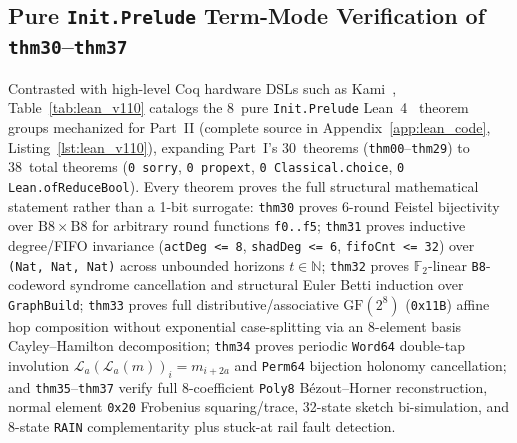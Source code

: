 \documentclass[10pt,twocolumn]{article}
\providecommand{\LeanPartOneTotal}{30}
\providecommand{\LeanNewExpansion}{8}
\providecommand{\LeanCumulativeTotal}{38}
\theoremstyle{spectralthm}
\begin{document}
\subsection{Pure \texorpdfstring{\texttt{Init.Prelude}}{Init.Prelude} Term-Mode Verification of \texorpdfstring{\texttt{thm30}--\texttt{thm37}}{thm30--thm37}}
Contrasted with high-level Coq hardware DSLs such as Kami~\cite{choi2017kami}, Table~\ref{tab:lean_v110} catalogs the \LeanNewExpansion\ pure \texttt{Init.Prelude} Lean~4~\cite{demoura2021lean4} theorem groups mechanized for Part~II (complete source in Appendix~\ref{app:lean_code}, Listing~\ref{lst:lean_v110}), expanding Part~I's \LeanPartOneTotal\ theorems (\texttt{thm00}--\texttt{thm29}) to \LeanCumulativeTotal\ total theorems (\texttt{0 sorry}, \texttt{0 propext}, \texttt{0 Classical.choice}, \texttt{0 Lean.ofReduceBool}). Every theorem proves the full structural mathematical statement rather than a 1-bit surrogate: \texttt{thm30} proves 6-round Feistel bijectivity over $\mathrm{B8}\times\mathrm{B8}$ for arbitrary round functions \texttt{f0..f5}; \texttt{thm31} proves inductive degree/FIFO invariance (\texttt{actDeg <= 8}, \texttt{shadDeg <= 6}, \texttt{fifoCnt <= 32}) over \texttt{(Nat, Nat, Nat)} across unbounded horizons $t \in \mathbb{N}$; \texttt{thm32} proves $\mathbb{F}_2$-linear \texttt{B8}-codeword syndrome cancellation and structural Euler Betti induction over \texttt{GraphBuild}; \texttt{thm33} proves full distributive/associative $\mathrm{GF}(2^8)$ (\texttt{0x11B}) affine hop composition without exponential case-splitting via an 8-element basis Cayley--Hamilton decomposition; \texttt{thm34} proves periodic \texttt{Word64} double-tap involution $\mathcal{L}_a(\mathcal{L}_a(m))_i = m_{i+2a}$ and \texttt{Perm64} bijection holonomy cancellation; and \texttt{thm35}--\texttt{thm37} verify full 8-coefficient \texttt{Poly8} B\'{e}zout--Horner reconstruction, normal element \texttt{0x20} Frobenius squaring/trace, 32-state sketch bi-simulation, and 8-state \texttt{RAIN} complementarity plus stuck-at rail fault detection.
\end{document}
